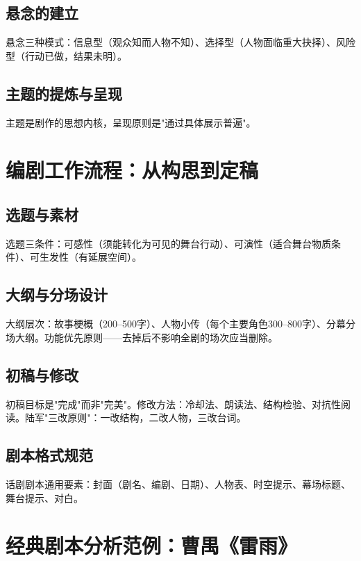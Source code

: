 \subsection{悬念的建立}

悬念三种模式：信息型（观众知而人物不知）、选择型（人物面临重大抉择）、风险型（行动已做，结果未明）。

\subsection{主题的提炼与呈现}

主题是剧作的思想内核，呈现原则是"通过具体展示普遍"。

\section{编剧工作流程：从构思到定稿}

\subsection{选题与素材}

选题三条件\cite{lu:playwriting}：可感性（须能转化为可见的舞台行动）、可演性（适合舞台物质条件）、可生发性（有延展空间）。

\subsection{大纲与分场设计}

大纲层次：故事梗概（200--500字）、人物小传（每个主要角色300--800字）、分幕分场大纲。功能优先原则——去掉后不影响全剧的场次应当删除。

\subsection{初稿与修改}

初稿目标是"完成"而非"完美"。修改方法：冷却法、朗读法、结构检验、对抗性阅读。陆军"三改原则"\cite{lu:playwriting}：一改结构，二改人物，三改台词。

\subsection{剧本格式规范}

话剧剧本通用要素：封面（剧名、编剧、日期）、人物表、时空提示、幕场标题、舞台提示、对白。

\section{经典剧本分析范例：曹禺《雷雨》}

